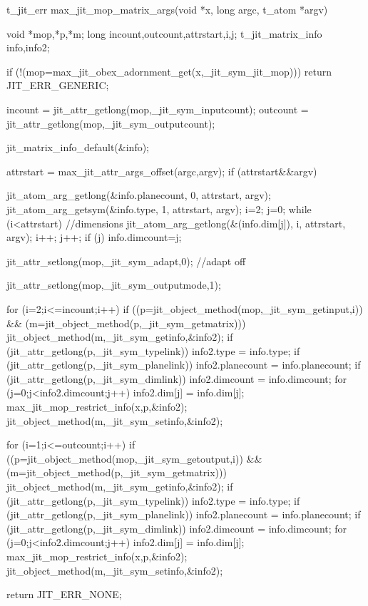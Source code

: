 \begin{DoxyCode}
t_jit_err max_jit_mop_matrix_args(void *x, long argc, t_atom *argv)
{
   void *mop,*p,*m;
   long incount,outcount,attrstart,i,j;
   t_jit_matrix_info info,info2;
      
   if (!(mop=max_jit_obex_adornment_get(x,_jit_sym_jit_mop)))
      return JIT_ERR_GENERIC;

   incount  = jit_attr_getlong(mop,_jit_sym_inputcount);
   outcount = jit_attr_getlong(mop,_jit_sym_outputcount);
   
   jit_matrix_info_default(&info);
   
   attrstart = max_jit_attr_args_offset(argc,argv);
   if (attrstart&&argv) {
      jit_atom_arg_getlong(&info.planecount, 0, attrstart, argv);
      jit_atom_arg_getsym(&info.type, 1, attrstart, argv);
      i=2; j=0;
      while (i<attrstart) { //dimensions
         jit_atom_arg_getlong(&(info.dim[j]), i, attrstart, argv);
         i++; j++;
      }
      if (j) info.dimcount=j;
      
      jit_attr_setlong(mop,_jit_sym_adapt,0); //adapt off
   }
   
   jit_attr_setlong(mop,_jit_sym_outputmode,1); 
      
   for (i=2;i<=incount;i++) {
      if ((p=jit_object_method(mop,_jit_sym_getinput,i)) &&
         (m=jit_object_method(p,_jit_sym_getmatrix)))
      {
         jit_object_method(m,_jit_sym_getinfo,&info2);
         if (jit_attr_getlong(p,_jit_sym_typelink)) {
            info2.type = info.type;
         }
         if (jit_attr_getlong(p,_jit_sym_planelink)) {
            info2.planecount = info.planecount;
         }
         if (jit_attr_getlong(p,_jit_sym_dimlink)) {
            info2.dimcount = info.dimcount;
            for (j=0;j<info2.dimcount;j++) {
               info2.dim[j] = info.dim[j];
            }
         }
         max_jit_mop_restrict_info(x,p,&info2);
         jit_object_method(m,_jit_sym_setinfo,&info2);
      }
   }

   for (i=1;i<=outcount;i++) {
      if ((p=jit_object_method(mop,_jit_sym_getoutput,i)) &&
         (m=jit_object_method(p,_jit_sym_getmatrix)))
      {
         jit_object_method(m,_jit_sym_getinfo,&info2);
         if (jit_attr_getlong(p,_jit_sym_typelink)) {
            info2.type = info.type;
         }
         if (jit_attr_getlong(p,_jit_sym_planelink)) {
            info2.planecount = info.planecount;
         }
         if (jit_attr_getlong(p,_jit_sym_dimlink)) {
            info2.dimcount = info.dimcount;
            for (j=0;j<info2.dimcount;j++) {
               info2.dim[j] = info.dim[j];
            }
         }
         max_jit_mop_restrict_info(x,p,&info2);
         jit_object_method(m,_jit_sym_setinfo,&info2);
      }
   }
      
   return JIT_ERR_NONE;
}
\end{DoxyCode}
 